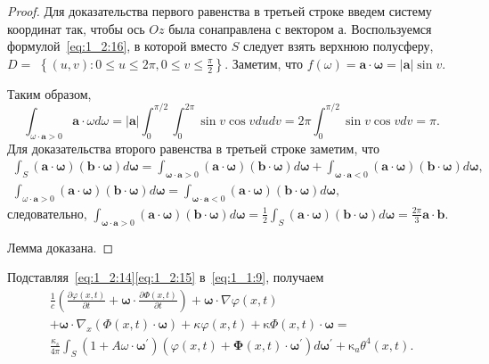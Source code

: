 \begin{proof}
Для доказательства первого равенства в третьей строке введем систему
координат так, чтобы ось $O z$ была сонаправлена с вектором а.
Воспользуемся формулой~\eqref{eq:1_2:16}, в которой вместо $S$ следует
взять верхнюю полусферу, $D=$ $\left\{(u, v): 0 \leqslant u
\leqslant 2 \pi, 0 \leqslant v \leqslant \frac{\pi}{2}\right\}$.
Заметим, что $f(\omega)=\mathbf{a} \cdot \boldsymbol{\omega}=|\mathbf{a}| \sin v$.

Таким образом,
\[
    \int_{\omega \cdot \mathbf{a}>0} \mathbf{a} \cdot \omega d \omega=|\mathbf{a}|
    \int_{0}^{\pi / 2} \int_{0}^{2 \pi} \sin v \cos v d u d v =
    2 \pi \int_{0}^{\pi / 2} \sin v \cos v d v=\pi.
\]
Для доказательства второго равенства в третьей строке заметим, что
\[
    \begin{gathered}
        \int_{S}(\mathbf{a} \cdot \boldsymbol{\omega})(\mathbf{b}
        \cdot \boldsymbol{\omega}) d
        \boldsymbol{\omega}=\int_{\boldsymbol{\omega} \cdot
        \mathbf{a}>0}(\mathbf{a} \cdot \boldsymbol{\omega})(\mathbf{b}
        \cdot \mathbf{\omega}) d
        \boldsymbol{\omega}+
        \int_{\boldsymbol{\omega} \cdot \mathbf{a}<0}(\mathbf{a}
        \cdot \boldsymbol{\omega})(\mathbf{b}
        \cdot \boldsymbol{\omega}) d \boldsymbol{\omega}, \\
        \int_{\omega \cdot \mathbf{a}>0}(\mathbf{a}
        \cdot \boldsymbol{\omega})(\mathbf{b}
        \cdot \boldsymbol{\omega}) d
        \boldsymbol{\omega}=\int_{\boldsymbol{\omega}
        \cdot \mathbf{a}<0}(\mathbf{a}
        \cdot \boldsymbol{\omega})(\mathbf{b}
        \cdot \boldsymbol{\omega}) d \boldsymbol{\omega},
    \end{gathered}
\]
следовательно,
$
\int_{\boldsymbol{\omega} \cdot \mathbf{a}>0}(\mathbf{a}
\cdot \boldsymbol{\omega})(\mathbf{b}
\cdot \boldsymbol{\omega}) d \boldsymbol{\omega}=
\frac{1}{2} \int_{S}(\mathbf{a}
\cdot \boldsymbol{\omega})(\mathbf{b}
\cdot \boldsymbol{\omega}) d \boldsymbol{\omega}=
\frac{2 \pi}{3} \mathbf{a} \cdot \mathbf{b}.
$


Лемма доказана.
\end{proof}

Подставляя~\eqref{eq:1_2:14}\eqref{eq:1_2:15} в~\eqref{eq:1_1:9}, получаем
\begin{gather*}
    \frac{1}{c}\left(\frac{\partial \varphi(x, t)}{\partial t}
    + \boldsymbol{\omega} \cdot \frac{\partial \Phi(x, t)}{\partial t}\right)
    + \boldsymbol{\omega} \cdot \nabla \varphi(x, t) \\
    + \boldsymbol{\omega} \cdot \nabla_{x}(\Phi(x, t) \cdot \boldsymbol{\omega})
    + \kappa \varphi(x, t)
    + \mathrm{\kappa} \Phi(x, t) \cdot \boldsymbol{\omega}= \\
    \frac{\kappa_{s}}{4 \pi} \int_{S}\left(1+A \omega \cdot
    \boldsymbol{\omega}^{\prime}\right)\left(\varphi(x, t)+\boldsymbol{\Phi}(x, t)
    \cdot \boldsymbol{\omega}^{\prime}\right) d \boldsymbol{\omega}^{\prime}
    + \mathrm{\kappa}_{a} \theta^{4}(x, t).
\end{gather*}

